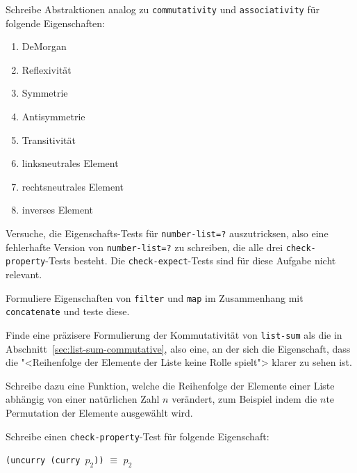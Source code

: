 \begin{aufgabe}  Schreibe Abstraktionen analog zu \lstinline{commutativity} und
  \lstinline{associativity} für folgende Eigenschaften:
  \begin{enumerate}
  \item DeMorgan
  \item Reflexivität
  \item Symmetrie
  \item Antisymmetrie
  \item Transitivität
  \item linksneutrales Element
  \item rechtsneutrales Element
  \item inverses Element
  \end{enumerate}
\end{aufgabe}


\begin{aufgabe}
  Versuche, die Eigenschafts-Tests für \lstinline{number-list=?}
  auszutricksen, also eine fehlerhafte Version von
  \lstinline{number-list=?} zu schreiben, die alle drei
  \lstinline{check-property}-Tests besteht.
  Die \lstinline{check-expect}-Tests sind für diese Aufgabe nicht relevant.
\end{aufgabe}

\begin{aufgabe}
  Formuliere Eigenschaften von \lstinline{filter} und \lstinline{map}
  im Zusammenhang mit \lstinline{concatenate} und teste diese.
\end{aufgabe}

\begin{aufgabe}
  Finde eine präzisere Formulierung der Kommutativität von
  \lstinline{list-sum} als die in
  Abschnitt~\ref{sec:list-sum-commutative}, also eine, an der sich die
  Eigenschaft, dass die "<Reihenfolge der Elemente der Liste keine
  Rolle spielt"> klarer zu sehen ist.

  Schreibe dazu eine Funktion, welche die Reihenfolge der
  Elemente einer Liste abhängig von einer natürlichen Zahl $n$
  verändert, zum Beispiel indem die $n$te Permutation der Elemente ausgewählt
  wird.
\end{aufgabe}

\begin{aufgabe}
  Schreibe einen \lstinline{check-property}-Test für folgende Eigenschaft:
  \begin{center}
    \texttt{(uncurry (curry $p_2$))} $\equiv$ $p_2$
  \end{center}
\end{aufgabe}

